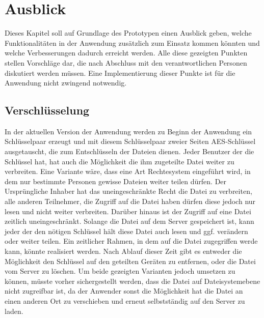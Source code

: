 \documentclass[10pt, a4paper]{scrreprt}
\begin{document}
\section{Ausblick}
Dieses Kapitel soll auf Grundlage des Prototypen einen Ausblick geben, welche Funktionalitäten in der Anwendung zusätzlich zum Einsatz kommen könnten und welche Verbesserungen dadurch erreicht werden. Alle diese gezeigten Punkten stellen Vorschläge dar, die nach Abschluss mit den verantwortlichen Personen diskutiert werden müssen. Eine Implementierung dieser Punkte ist für die Anwendung nicht zwingend notwendig.


\subsection{Verschlüsselung}
In der aktuellen Version der Anwendung werden zu Beginn der Anwendung ein Schlüsselpaar erzeugt und mit diesem Schlüsselpaar zweier Seiten AES-Schlüssel ausgetauscht, die zum Entschlüsseln der Dateien dienen. Jeder Benutzer der die Schlüssel hat, hat auch die Möglichkeit die ihm zugeteilte Datei weiter zu verbreiten. Eine Variante wäre, dass eine Art Rechtesystem eingeführt wird, in dem nur bestimmte Personen gewisse Dateien weiter teilen dürfen. Der Ursprüngliche Inhaber hat das uneingeschränkte Recht die Datei zu verbreiten, alle anderen Teilnehmer, die Zugriff auf die Datei haben dürfen diese jedoch nur lesen und nicht weiter verbreiten. Darüber hinaus ist der Zugriff auf eine Datei zeitlich uneingeschränkt. Solange die Datei auf dem Server gespeichert ist, kann jeder der den nötigen Schlüssel hält diese Datei auch lesen und ggf. verändern oder weiter teilen. Ein zeitlicher Rahmen, in dem auf die Datei zugegriffen werde kann, könnte realisiert werden. Nach Ablauf dieser Zeit gibt es entweder die Möglichkeit den Schlüssel auf den geteilten Geräten zu entfernen, oder die Datei vom Server zu löschen. Um beide gezeigten Varianten jedoch umsetzen zu können, müsste vorher sichergestellt werden, dass die Datei auf Dateisystemebene nicht zugreifbar ist, da der Anwender sonst die Möglichkeit hat die Datei an einen anderen Ort zu verschieben und erneut selbstständig auf den Server zu laden.
\end{document}
